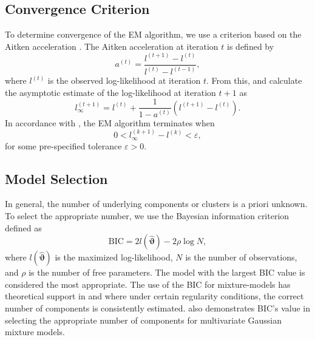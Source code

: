 \documentclass[12pt]{report}
\begin{document}
\subsection{Convergence Criterion}
To determine convergence of the EM algorithm, we use a criterion based on the Aitken acceleration \citep{aitken1926}. The Aitken acceleration at iteration $t$ is defined by 
\begin{equation*}
a^{(t)} = \frac{l^{(t+1)} - l^{(t)} }{l^{(t)} - l^{(t-1)}},
\end{equation*}
where $l^{(t)}$ is the observed log-likelihood at iteration $t$. From this, \citet{lindsay1995} and \citet{bohning1994} calculate the asymptotic estimate of the log-likelihood at iteration $t+1$ as
\begin{equation*}
l_{\infty}^{(t+1)} = l^{(t)} + \frac{1}{1- a^{(t)}} (l^{(t+1)} - l^{(t)}).
\end{equation*}
In accordance with \citet{mcnicholas2010}, the EM algorithm terminates when 
\begin{equation*}
0< l_{\infty}^{(k+1)} - l^{(k)} < \varepsilon,
\end{equation*}
for some pre-specified tolerance $\varepsilon > 0$.




\subsection{Model Selection}
In general, the number of underlying components or clusters is a priori unknown. To select the appropriate number, we use the Bayesian information criterion \citep[BIC;][]{schwarz1978} defined as 
\begin{equation*}
\text{BIC} = 2 l(\hat{\bm{\vartheta}}) - 2 \rho \log N,
\end{equation*}
where $l(\hat{\bm{\vartheta}})$ is the maximized log-likelihood, $N$ is the number of observations, and $\rho$ is the number of free parameters. The model with the largest BIC value is considered the most appropriate. The use of the BIC for mixture-models has theoretical support in \citet{leroux1992} and \citet{keribin2000} where under certain regularity conditions, the correct number of components is consistently estimated. \citet{dasgupta1998} also demonstrates BIC's value in selecting the appropriate number of components for multivariate Gaussian mixture models. 
\end{document}
